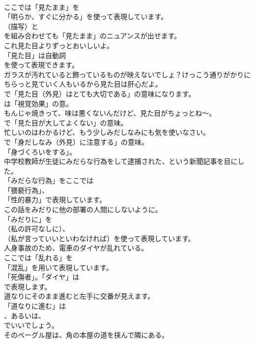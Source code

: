 \documentclass[8pt]{extreport}
\begin{document}
\begin{CJK}{UTF8}{min}
\\	ここでは「見たまま」を
\\	「明らか、すぐに分かる」を使って表現しています。
\\	（描写）と
\\	を組み合わせても「見たまま」のニュアンスが出せます。	
\\	これ見た目よりずっとおいしいよ。 
\\	「見た目」は自動詞
\\	を使って表現できます。	
\\	ガラスが汚れていると飾っているものが映えないでしょ？けっこう通りがかりにちらっと見ていく人もいるから見た目は肝心だよ。 
\\	で「見た目（外見）はとても大切である」の意味になります。
\\	は「視覚効果」の意。	
\\	もんじゃ焼きって、味は悪くないんだけど、見た目がちょっとね～。 
\\	で「見た目が大してよくない」の意味。	
\\	忙しいのはわかるけど、もう少しみだしなみにも気を使いなさい。 
\\	で「身だしなみ（外見）に注意する」の意味。
\\	「身づくろいをする」。	
\\	中学校教師が生徒にみだらな行為をして逮捕された、という新聞記事を目にした。 
\\	「みだらな行為」をここでは
\\	「猥褻行為」、
\\	「性的暴力」で表現しています。	
\\	この話をみだりに他の部署の人間にしないように。 
\\	「みだりに」を 
\\	（私の許可なしに）、
\\	（私が言っていいといわなければ）を使って表現しています。	
\\	人身事故のため、電車のダイヤが乱れている。 
\\	ここでは「乱れる」を
\\	「混乱」を用いて表現しています。
\\	「死傷者」。「ダイヤ」は
\\	で表現します。	
\\	道なりにそのまま進むと左手に交番が見えます。 
\\	「道なりに進む」は
\\	、あるいは、
\\	でいいでしょう。	
\\	そのベーグル屋は、角の本屋の道を挟んで隣にある。 

\end{CJK}
\end{document}
